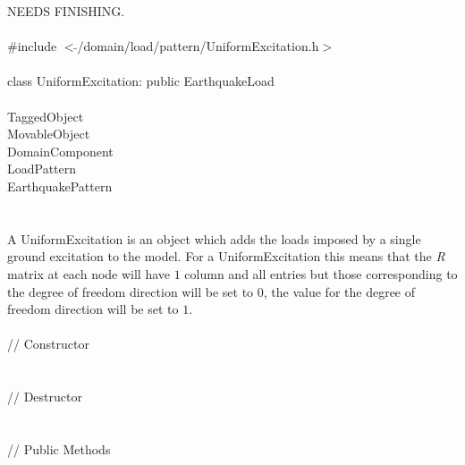 
NEEDS FINISHING. \\

   \\
\indent \#include $<\tilde{ }$/domain/load/pattern/UniformExcitation.h$>$  \\

  \\
\indent class UniformExcitation: public EarthquakeLoad  \\

 \\
\indent TaggedObject \\
\indent MovableObject \\
\indent\indent DomainComponent \\
\indent\indent\indent LoadPattern \\
\indent\indent\indent\indent EarthquakePattern \\
\indent\indent\indent{} \\

 \\ 
\indent A UniformExcitation is an object which adds the loads imposed
by a single ground excitation to the model. For a UniformExcitation
this means that the {\em R} matrix at each node will have $1$ column
and all entries but those corresponding to the degree of freedom
direction will be set to $0$, the value for the degree of freedom
direction will be set to $1$.\\

 \\
\indent // Constructor \\ 
\\ \\
\indent // Destructor \\ 
\\  \\
\indent // Public Methods \\ 
 \\ 
\\
\\
\\

